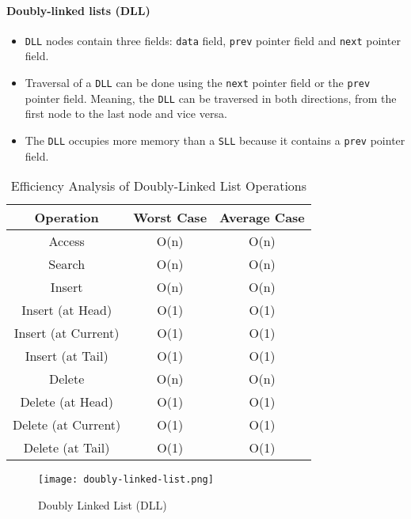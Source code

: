 \paragraph{Doubly-linked lists (DLL)}
\begin{itemize}
    \item \lstinline{DLL} nodes contain three fields: \lstinline{data} field, \lstinline{prev} pointer field and \lstinline{next} pointer field.
    \item Traversal of a \lstinline{DLL} can be done using the \lstinline{next} pointer field or the \lstinline{prev} pointer field. Meaning, the \lstinline{DLL} can be traversed in both directions, from the first node to the last node and vice versa.
    \item The \lstinline{DLL} occupies more memory than a \lstinline{SLL} because it contains a \lstinline{prev} pointer field.
\end{itemize}
\begin{table}[h]
    \centering
    \caption{Efficiency Analysis of Doubly-Linked List Operations}
    \label{tab:doubly-linked-list-efficiency-analysis}
    \begin{tabular}{|c|c|c|}
        \hline
        Operation           & Worst Case & Average Case \\ \hline
        Access              & O(n)       & O(n)         \\ \hline
        Search              & O(n)       & O(n)         \\ \hline
        Insert              & O(n)       & O(n)         \\ \hline
        Insert (at Head)    & O(1)       & O(1)         \\ \hline
        Insert (at Current) & O(1)       & O(1)         \\ \hline
        Insert (at Tail)    & O(1)       & O(1)         \\ \hline
        Delete              & O(n)       & O(n)         \\ \hline
        Delete (at Head)    & O(1)       & O(1)         \\ \hline
        Delete (at Current) & O(1)       & O(1)         \\ \hline
        Delete (at Tail)    & O(1)       & O(1)         \\ \hline
    \end{tabular}
\end{table}
\begin{figure}[!htbp]
    \centering
    \texttt{[image: doubly-linked-list.png]}
    \caption{Doubly Linked List (DLL) \cite{vaghani_2023}}
    \label{fig:doubly-linked-list}
\end{figure}
\newpage
% 

